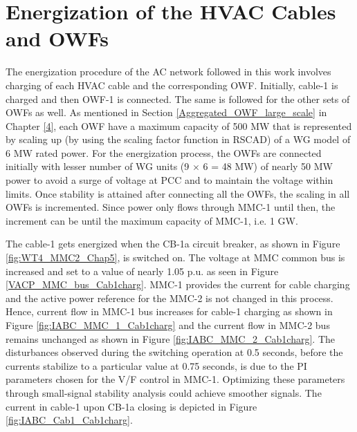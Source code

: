 \section{Energization of the HVAC Cables and OWFs}\label{energization_HVAC_Cables}
The energization procedure of the \gls{AC} network followed in this work involves charging of each \gls{HVAC} cable and the corresponding \gls{OWF}. Initially, cable-1 is charged and then \gls{OWF}-1 is connected. The same is followed for the other sets of \gls{OWF}s as well. As mentioned in Section \ref{Aggregated_OWF_large_scale} in Chapter \ref{4}, each \gls{OWF} have a maximum capacity of 500 MW that is represented by scaling up (by using the scaling factor function in RSCAD) of a \gls{WG} model of 6 MW rated power. For the energization process, the \gls{OWF}s are connected initially with lesser number of \gls{WG} units (9 $\times$ 6 = 48 MW) of nearly 50 MW power to avoid a surge of voltage at \gls{PCC} and to maintain the voltage within limits. Once stability is attained after connecting all the \gls{OWF}s, the scaling in all \gls{OWF}s is incremented. Since power only flows through \gls{MMC}-1 until then, the increment can be until the maximum capacity of \gls{MMC}-1, i.e. 1 GW.

The cable-1 gets energized when the CB-1a circuit breaker, as shown in Figure \ref{fig:WT4_MMC2_Chap5}, is switched on. The voltage at \gls{MMC} common bus is increased and set to a value of nearly 1.05 p.u. as seen in Figure \ref{VACP_MMC_bus_Cab1charg}. \gls{MMC}-1 provides the current for cable charging and the active power reference for the \gls{MMC}-2 is not changed in this process. Hence, current flow in \gls{MMC}-1 bus increases for cable-1 charging as shown in Figure \ref{fig:IABC_MMC_1_Cab1charg} and the current flow in \gls{MMC}-2 bus remains unchanged as shown in Figure \ref{fig:IABC_MMC_2_Cab1charg}. The disturbances observed during the switching operation at 0.5 seconds, before the currents stabilize to a particular value at 0.75 seconds, is due to the \gls{PI} parameters chosen for the V/F control in \gls{MMC}-1. Optimizing these parameters through small-signal stability analysis could achieve smoother signals. The current in cable-1 upon CB-1a closing is depicted in Figure \ref{fig:IABC_Cab1_Cab1charg}. 

